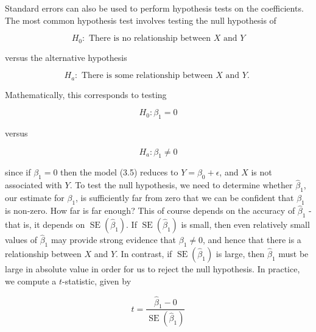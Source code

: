\documentclass[10pt]{article}
\begin{document}
Standard errors can also be used to perform hypothesis tests on the coefficients. The most common hypothesis test involves testing the null hypothesis of


\begin{equation*}
H_{0}: \text { There is no relationship between } X \text { and } Y \tag{3.12}
\end{equation*}


versus the alternative hypothesis


\begin{equation*}
H_{a}: \text { There is some relationship between } X \text { and } Y \text {. } \tag{3.13}
\end{equation*}


Mathematically, this corresponds to testing

$$
H_{0}: \beta_{1}=0
$$

versus

$$
H_{a}: \beta_{1} \neq 0
$$

since if $\beta_{1}=0$ then the model (3.5) reduces to $Y=\beta_{0}+\epsilon$, and $X$ is not associated with $Y$. To test the null hypothesis, we need to determine whether $\hat{\beta}_{1}$, our estimate for $\beta_{1}$, is sufficiently far from zero that we can be confident that $\beta_{1}$ is non-zero. How far is far enough? This of course depends on the accuracy of $\hat{\beta}_{1}$ - that is, it depends on $\operatorname{SE}\left(\hat{\beta}_{1}\right)$. If $\operatorname{SE}\left(\hat{\beta}_{1}\right)$ is small, then even relatively small values of $\hat{\beta}_{1}$ may provide strong evidence that $\beta_{1} \neq 0$, and hence that there is a relationship between $X$ and $Y$. In contrast, if $\operatorname{SE}\left(\hat{\beta}_{1}\right)$ is large, then $\hat{\beta}_{1}$ must be large in absolute value in order for us to reject the null hypothesis. In practice, we compute a $t$-statistic, given by


\begin{equation*}
t=\frac{\hat{\beta}_{1}-0}{\operatorname{SE}\left(\hat{\beta}_{1}\right)} \tag{3.14}
\end{equation*}
\end{document}

